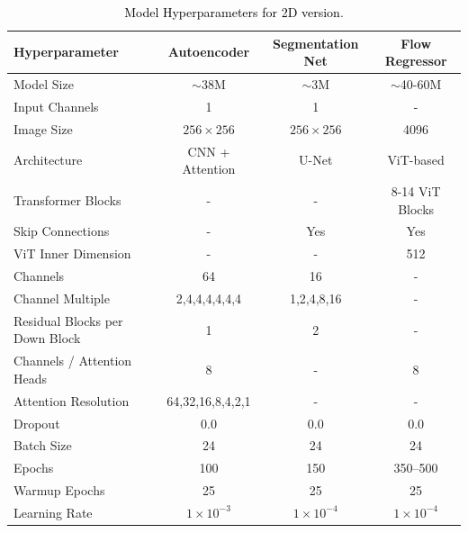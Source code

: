 \documentclass[twoside]{article}
\newcommand{\bc}[1]{\textcolor{black}{#1}}
\begin{document}
\begin{table}[th]
\centering
\caption{\bc{Model Hyperparameters for 2D version}.}
\label{tab:all_params}
\begin{tabular}{lccc}
\toprule
\textbf{Hyperparameter}         & \textbf{Autoencoder}     & \textbf{Segmentation Net} & \textbf{Flow Regressor} \\
\midrule
Model Size                      & $\sim$38M                     & $\sim$3M  & $\sim$40-60M     \\
Input Channels                  & 1                        & 1                         & -        \\
Image Size                      & $256 \times 256$         & $256 \times 256$          & 4096                       \\
Architecture                   & CNN + Attention            & U-Net                    & ViT-based               \\
Transformer Blocks              & -                        & -                         & 8-14 ViT Blocks           \\
Skip Connections                & -                        & Yes                       & Yes \\
ViT Inner Dimension             & -                        & -                         & 512                     \\
Channels                        &  64                      & 16                         & -            \\
Channel Multiple                & 2,4,4,4,4,4,4          & 1,2,4,8,16                   & -    \\
Residual Blocks per Down Block  & 1                      & 2                           & -              \\
Channels / Attention Heads      & 8                        & -                         & 8                       \\
Attention Resolution            & 64,32,16,8,4,2,1         & -                         & -            \\
Dropout                         & 0.0                      & 0.0                       & 0.0                     \\
Batch Size                      & 24                        & 24                        & 24                      \\
Epochs                          & 100                       & 150                       & 350--500                \\
Warmup Epochs                   & 25                       & 25                        & 25                       \\
Learning Rate                   & $1 \times 10^{-3}$       & $1 \times 10^{-4}$        & $1 \times 10^{-4}$   \\ 
\bottomrule
\end{tabular}
\end{table}
\end{document}
